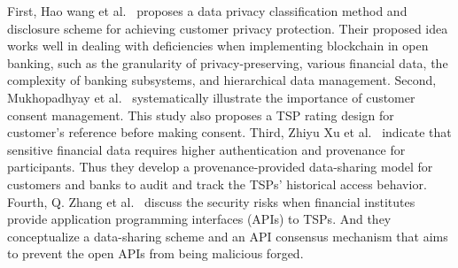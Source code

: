 First, Hao wang et al.~\cite{wang2020blockchain} proposes a data privacy classification method and disclosure scheme for achieving customer privacy protection. Their proposed idea works well in dealing with deficiencies when implementing blockchain in open banking, such as the granularity of privacy-preserving, various financial data, the complexity of banking subsystems, and hierarchical data management. Second, Mukhopadhyay et al.~\cite{mukhopadhyay2021blockchain} systematically illustrate the importance of customer consent management. This study also proposes a TSP rating design for customer's reference before making consent. Third, Zhiyu Xu et al.~\cite{xu2020ppm} indicate that sensitive financial data requires higher authentication and provenance for participants. Thus they develop a provenance-provided data-sharing model for customers and banks to audit and track the TSPs' historical access behavior. Fourth, Q. Zhang et al.~\cite{zhang2019obbc} discuss the security risks when financial institutes provide application programming interfaces (APIs) to TSPs. And they conceptualize a data-sharing scheme and an API consensus mechanism that aims to prevent the open APIs from being malicious forged.
